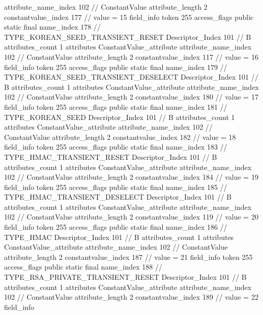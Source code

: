 {{{{{{{					attribute_name_index	102		// ConstantValue
					attribute_length	2
					constantvalue_index	177		// value = 15
				}
				}
			}
			field_info {
				token	255
				access_flags	public static final
				name_index	178		// TYPE_KOREAN_SEED_TRANSIENT_RESET
				Descriptor_Index	101		// B
				attributes_count	1
				attributes {
				ConstantValue_attribute {
					attribute_name_index	102		// ConstantValue
					attribute_length	2
					constantvalue_index	117		// value = 16
				}
				}
			}
			field_info {
				token	255
				access_flags	public static final
				name_index	179		// TYPE_KOREAN_SEED_TRANSIENT_DESELECT
				Descriptor_Index	101		// B
				attributes_count	1
				attributes {
				ConstantValue_attribute {
					attribute_name_index	102		// ConstantValue
					attribute_length	2
					constantvalue_index	180		// value = 17
				}
				}
			}
			field_info {
				token	255
				access_flags	public static final
				name_index	181		// TYPE_KOREAN_SEED
				Descriptor_Index	101		// B
				attributes_count	1
				attributes {
				ConstantValue_attribute {
					attribute_name_index	102		// ConstantValue
					attribute_length	2
					constantvalue_index	182		// value = 18
				}
				}
			}
			field_info {
				token	255
				access_flags	public static final
				name_index	183		// TYPE_HMAC_TRANSIENT_RESET
				Descriptor_Index	101		// B
				attributes_count	1
				attributes {
				ConstantValue_attribute {
					attribute_name_index	102		// ConstantValue
					attribute_length	2
					constantvalue_index	184		// value = 19
				}
				}
			}
			field_info {
				token	255
				access_flags	public static final
				name_index	185		// TYPE_HMAC_TRANSIENT_DESELECT
				Descriptor_Index	101		// B
				attributes_count	1
				attributes {
				ConstantValue_attribute {
					attribute_name_index	102		// ConstantValue
					attribute_length	2
					constantvalue_index	119		// value = 20
				}
				}
			}
			field_info {
				token	255
				access_flags	public static final
				name_index	186		// TYPE_HMAC
				Descriptor_Index	101		// B
				attributes_count	1
				attributes {
				ConstantValue_attribute {
					attribute_name_index	102		// ConstantValue
					attribute_length	2
					constantvalue_index	187		// value = 21
				}
				}
			}
			field_info {
				token	255
				access_flags	public static final
				name_index	188		// TYPE_RSA_PRIVATE_TRANSIENT_RESET
				Descriptor_Index	101		// B
				attributes_count	1
				attributes {
				ConstantValue_attribute {
					attribute_name_index	102		// ConstantValue
					attribute_length	2
					constantvalue_index	189		// value = 22
				}
				}
			}
			field_info {
}}}}}

